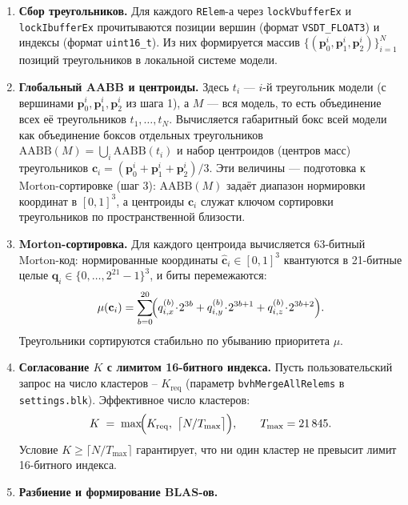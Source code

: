\begin{enumerate}
    \item \textbf{Сбор треугольников.} Для каждого
      \texttt{RElem}-а через \texttt{lockVbufferEx} и
      \texttt{lockIbufferEx} прочитываются позиции вершин
      (формат \texttt{VSDT\_FLOAT3}) и индексы (формат
      \texttt{uint16\_t}). Из них формируется массив
      $\{(\mathbf{p}_0^i, \mathbf{p}_1^i, \mathbf{p}_2^i)\}_{i=1}^{N}$
      позиций треугольников в локальной системе модели.
    \item \textbf{Глобальный AABB и центроиды.} Здесь $t_i$ --- $i$-й
      треугольник модели (с вершинами $\mathbf{p}_0^i, \mathbf{p}_1^i,
      \mathbf{p}_2^i$ из шага 1), а $M$ --- вся модель, то есть
      объединение всех её треугольников $t_1,\ldots,t_N$. Вычисляется
      габаритный бокс всей модели как объединение боксов отдельных
      треугольников
      $\mathrm{AABB}(M)\!=\!\bigcup_i \mathrm{AABB}(t_i)$ и набор
      центроидов (центров масс) треугольников
      $\mathbf{c}_i = (\mathbf{p}_0^i+\mathbf{p}_1^i+\mathbf{p}_2^i)/3$.
      Эти величины --- подготовка к Morton-сортировке (шаг 3):
      $\mathrm{AABB}(M)$ задаёт диапазон нормировки координат в
      $[0,1]^3$, а центроиды $\mathbf{c}_i$ служат ключом сортировки
      треугольников по пространственной близости.
    \item \textbf{Morton-сортировка.} Для каждого центроида
      вычисляется 63-битный Morton-код:
      нормированные координаты $\hat{\mathbf{c}}_i \in [0,1]^3$
      квантуются в 21-битные целые $\mathbf{q}_i \in
      \{0,\ldots,2^{21}-1\}^3$, и биты перемежаются:
      \[
          \mu(\mathbf{c}_i) =
          \sum_{b=0}^{20}\!\Bigl(
              q_{i,x}^{(b)}\!\cdot\!2^{3b}
              + q_{i,y}^{(b)}\!\cdot\!2^{3b+1}
              + q_{i,z}^{(b)}\!\cdot\!2^{3b+2}
          \Bigr).
      \]
      Треугольники сортируются стабильно по убыванию приоритета
      $\mu$.
    \item \textbf{Согласование $K$ с лимитом 16-битного индекса.}
      Пусть пользовательский запрос на число кластеров --
      $K_{\text{req}}$ (параметр
      \texttt{bvhMergeAllRelems} в \texttt{settings.blk}).
      Эффективное число кластеров:
      \[
          K \;=\; \max\!\Bigl(K_{\text{req}},\
              \bigl\lceil N / T_{\max} \bigr\rceil\Bigr),
          \qquad T_{\max} = 21\,845.
      \]
      Условие $K \ge \lceil N/T_{\max} \rceil$ гарантирует, что
      ни один кластер не превысит лимит 16-битного индекса.
    \item \textbf{Разбиение и формирование BLAS-ов.}

\end{enumerate}
